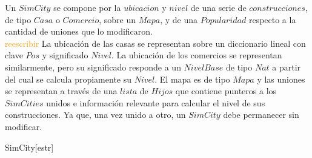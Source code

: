 \begin{Representacion}
  
Un $SimCity$ se compone por la $ubicacion$ y $nivel$ de una serie de $construcciones$, de tipo $Casa$ o $Comercio$, sobre un $Mapa$, y de una $Popularidad$ respecto a la cantidad de uniones que lo modificaron. \\

\textcolor{orange}{reescribir} La ubicación de las casas se representan sobre un diccionario lineal con clave $Pos$ y significado $Nivel$. La ubicación de los comercios se representan similarmente, pero su significado responde a un $NivelBase$ de tipo $Nat$ a partir del cual se calcula propiamente su $Nivel$. El mapa es de tipo $Mapa$ y las uniones se representan a través de una $lista$ de $Hijos$ que contiene punteros a los $SimCities$ unidos e información relevante para calcular el nivel de sus construcciones. Ya que, una vez unido a otro, un $SimCity$ debe permanecer sin modificar. 

    \begin{Estructura}{SimCity}[estr]
        \begin{Tupla}[estr]
        \end{Tupla}
        
        \vspace{2mm}
        \begin{Tupla}[hijo]
        \end{Tupla}
        
        \vspace{2mm}
        \begin{Tupla}[pos]
        \end{Tupla}

    \end{Estructura}


\end{Representacion}
